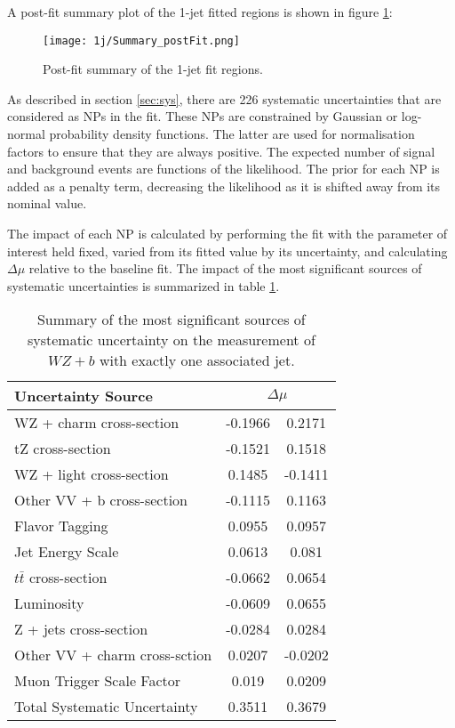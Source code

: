 A post-fit summary plot of the 1-jet fitted regions is shown in figure \ref{fig:fit_results_1j}: 

\begin{figure}[H]
    \center
    \texttt{[image: 1j/Summary\_postFit.png]}
    \caption{Post-fit summary of the 1-jet fit regions.}
    \label{fig:fit_results_1j}
\end{figure}

As described in section \ref{sec:sys}, there are 226 systematic uncertainties that are considered as NPs in the fit. These NPs are constrained by Gaussian or log-normal probability density functions. The latter are used for normalisation factors to ensure that they are always positive. The expected number of signal and background events are functions of the likelihood. The prior for each NP is added as a penalty term, decreasing the likelihood as it is shifted away from its nominal value. 

The impact of each NP is calculated by performing the fit with the parameter of interest held fixed, varied from its fitted value by its uncertainty, and calculating $\Delta\mu$ relative to the baseline fit.  The impact of the most significant sources of systematic uncertainties is summarized in table \ref{tab:systematics_1j}. 

\begin{table}[H]
    \centering
    \begin{tabular}{l|cc}
        \hline\hline
        Uncertainty Source & \multicolumn{2}{c}{$\Delta \mu$ }  \\
        \hline
        WZ + charm cross-section & -0.1966 & 0.2171 \\
        tZ cross-section & -0.1521 & 0.1518 \\
        WZ + light cross-section & 0.1485 & -0.1411 \\
        Other VV + b cross-section & -0.1115 & 0.1163 \\
        Flavor Tagging & 0.0955 & 0.0957 \\
        Jet Energy Scale & 0.0613 & 0.081 \\
        $t\bar{t}$ cross-section & -0.0662 & 0.0654 \\
        Luminosity & -0.0609 & 0.0655 \\
        Z + jets cross-section & -0.0284 & 0.0284 \\
        Other VV + charm cross-sction & 0.0207 & -0.0202 \\
        Muon Trigger Scale Factor & 0.019 & 0.0209 \\
        \hline
        Total Systematic Uncertainty & 0.3511 & 0.3679 \\
        \hline\hline
    \end{tabular}
    \caption{Summary of the most significant sources of systematic uncertainty on the measurement of $WZ+b$ with exactly one associated jet.}
    \label{tab:systematics_1j}
\end{table}

